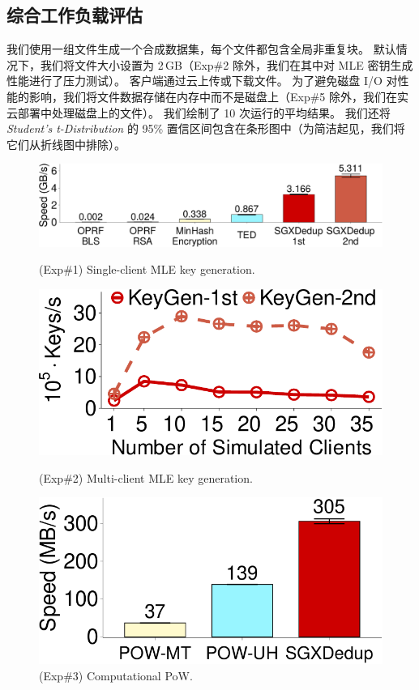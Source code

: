 \subsection{综合工作负载评估}
\label{subsec:synthetic}


我们使用一组文件生成一个合成数据集，每个文件都包含全局非重复块。 默认情况下，我们将文件大小设置为 2\,GB（Exp\#2 除外，我们在其中对 MLE 密钥生成性能进行了压力测试）。 客户端通过云上传或下载文件。 为了避免磁盘 I/O 对性能的影响，我们将文件数据存储在内存中而不是磁盘上（Exp\#5 除外，我们在实云部署中处理磁盘上的文件）。 我们绘制了 10 次运行的平均结果。 我们还将 {\em Student's t-Distribution} 的 95\% 置信区间包含在条形图中（为简洁起见，我们将它们从折线图中排除）。


\begin{figure}[t]
\hspace{-0.05in}
\begin{minipage}[t]{3.2in}
\centering
\includegraphics[height=.82in]{pic/sgxdedup/expa2_keyGenPerformance.pdf}
\vspace{-12pt}
\caption{(Exp\#1) Single-client MLE key generation.}
\label{fig:keygen-comparison}
\end{minipage}%
\hspace{0.2in}
\begin{minipage}[t]{1.65in}
\centering
\includegraphics[height=.82in]{pic/sgxdedup/expa3_keyScale_performance_number_multiThread.pdf}
\vspace{-12pt}
\caption{(Exp\#2) Multi-client MLE key generation.}
\label{fig:exp-keygen-scalability}
\end{minipage}%
\hspace{0.2in}
\begin{minipage}[t]{1.65in}
\centering
\includegraphics[height=.82in]{pic/sgxdedup/expa4_powPerformance.pdf}
\vspace{-12pt}
\caption{\small(Exp\#3) Computational PoW.}
\label{fig:pow-comparison}
\end{minipage}%
\vspace{-6pt}
\end{figure}


